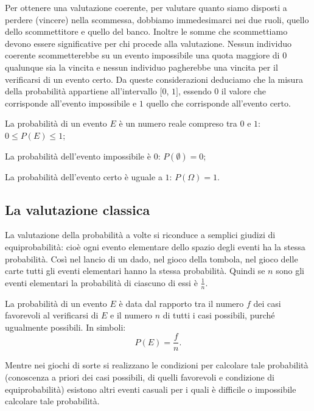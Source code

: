 Per ottenere una valutazione coerente, per valutare quanto siamo disposti a perdere (vincere) nella scommessa, dobbiamo immedesimarci nei due ruoli, quello dello scommettitore e quello del banco. Inoltre le somme che scommettiamo devono essere significative per chi procede alla valutazione.
Nessun individuo coerente scommetterebbe su un evento impossibile una quota maggiore di 0 qualunque sia la vincita e nessun individuo pagherebbe una vincita per il verificarsi di un evento certo.
Da queste considerazioni deduciamo che la misura della probabilità appartiene all'intervallo $[0$, $1]$, essendo $0$ il valore che corrisponde all'evento impossibile e $1$ quello che corrisponde all'evento certo.

\begin{postulato}\label{post:probabilita}
La probabilità di un evento $E$ è un numero reale compreso tra $0$ e $1$: $0\le P(E)\le 1$;

La probabilità dell'evento impossibile è $0$: $P(\emptyset)=0$;

La probabilità dell'evento certo è uguale a $1$: $P(\Omega)=1$.
\end{postulato}

\subsection{La valutazione classica}

La valutazione della probabilità a volte si riconduce a semplici giudizi di equiprobabilità: cioè ogni evento elementare dello spazio degli eventi ha la stessa probabilità. Così nel lancio di un dado, nel gioco della tombola, nel gioco delle carte tutti gli eventi elementari hanno la stessa probabilità. Quindi se $n$ sono gli eventi elementari la probabilità di ciascuno di essi è $\frac 1 n$.

La probabilità di un evento $E$ è data dal rapporto tra il numero $f$ dei casi favorevoli al verificarsi di $E$ e il numero $n$ di tutti i casi possibili, purché ugualmente possibili. In simboli: \[P(E)=\dfrac f n.\]

Mentre nei giochi di sorte si realizzano le condizioni per calcolare tale probabilità (conoscenza a priori dei casi possibili, di quelli favorevoli e condizione di equiprobabilità) esistono altri eventi casuali per i quali è difficile o impossibile calcolare tale probabilità.

